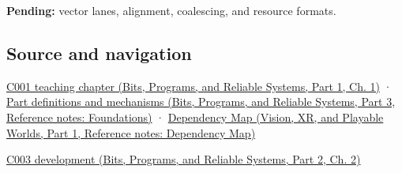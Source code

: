 \textbf{Pending:} vector lanes, alignment, coalescing, and resource formats.

\subsection{Source and navigation}\label{appendix-3c7b1a56de01-source-and-navigation}

\hypertarget{appendix-3c7b1a56de01-source-and-navigation}{}

\href{../01-Bits-Programs-and-Reliable-Systems-P01/main.pdf\#01-foundations-i-ch001-from-a-signal-to-an-interpretation}{C001 teaching chapter (Bits, Programs, and Reliable Systems, Part 1, Ch. 1)} · \href{../01-Bits-Programs-and-Reliable-Systems-P03/main.pdf\#appendix-fd090d982a15}{Part definitions and mechanisms (Bits, Programs, and Reliable Systems, Part 3, Reference notes: Foundations)} · \href{../07-Vision-XR-and-Playable-Worlds-P01/main.pdf\#appendix-4ad47bdd269a}{Dependency Map (Vision, XR, and Playable Worlds, Part 1, Reference notes: Dependency Map)}

\href{../01-Bits-Programs-and-Reliable-Systems-P02/main.pdf\#01-foundations-i-ch002-where-the-bytes-live}{C003 development (Bits, Programs, and Reliable Systems, Part 2, Ch. 2)}
